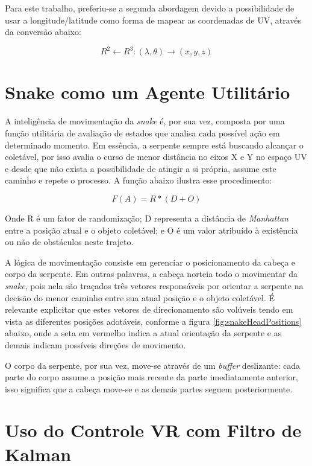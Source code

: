 \documentclass{vgtc}                          %
\begin{document}
Para este trabalho, preferiu-se a segunda abordagem devido a possibilidade de usar a longitude/latitude como forma de mapear as coordenadas de UV, através da conversão abaixo:

\begin{equation}
R^2 \leftarrow R^3 : (\lambda, \theta) \rightarrow (x, y, z)
\label{equation1}
\end{equation}

\section{Snake como um Agente Utilitário} \label{sec:agent}

A inteligência de movimentação da \textit{snake} é, por sua vez, composta por uma função utilitária de avaliação de estados que analisa cada possível ação em determinado momento. Em essência, a serpente sempre está buscando alcançar o coletável, por isso avalia o curso de menor distância no eixos X e Y no espaço UV e desde que não exista a possibilidade de atingir a si própria, assume este caminho e repete o processo. A função abaixo ilustra esse procedimento:

\begin{equation}
F(A) = R * (D + O)
\label{equation11}
\end{equation}

Onde R é um fator de randomização; D representa a distância de \textit{Manhattan} entre a posição atual e o objeto coletável; e O é um valor atribuído à existência ou não de obstáculos neste trajeto.

A lógica de movimentação consiste em gerenciar o posicionamento da cabeça e corpo da serpente.  Em outras palavras, a cabeça norteia todo o movimentar da \textit{snake}, pois nela são traçados três vetores responsáveis por orientar a serpente na decisão do menor caminho entre sua atual posição e o objeto coletável. É relevante explicitar que estes vetores de direcionamento são volúveis tendo em vista as diferentes posições adotáveis, conforme a figura \ref{fig:snakeHeadPositions} abaixo, onde a seta em vermelho indica a atual orientação da serpente e as demais indicam possíveis direções de movimento.

O corpo da serpente, por sua vez, move-se através de um \textit{buffer} deslizante: cada parte do corpo assume a posição mais recente da parte imediatamente anterior, isso significa que a cabeça move-se e as demais partes seguem posteriormente.

\section{Uso do Controle VR com Filtro de Kalman} \label{sec:gearvrcontroller}
\end{document}
